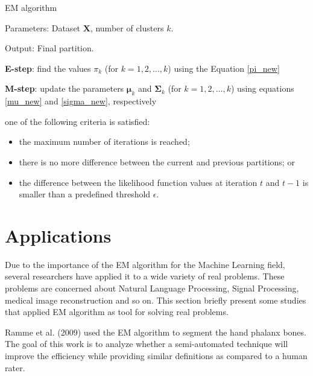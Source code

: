 \begin{algorithm}[ht]
	\caption{EM algorithm}
	\label{pseudocod}
    
    Parameters: Dataset $\textbf{X}$, number of clusters $k$.
    
    Output: Final partition.
    
	\begin{algorithmic}[1] 
		
        \REPEAT
		
		\STATE \textbf{E-step}: find the values $\pi_{k}$ (for $k = {1,2,\ldots,k}$) using the Equation \ref{pi_new}
		
		\STATE \textbf{M-step}: update the parameters $\bm{\mu}_k$ and $\bm{\Sigma}_k$ (for $k = {1,2,\ldots,k}$) using equations \ref{mu_new} and \ref{sigma_new}, respectively
				
		\UNTIL one of the following criteria is satisfied:
   \begin{itemize}
       \item the maximum number of iterations is reached;
       \item there is no more difference between the current and previous partitions; or
       \item the difference between the likelihood function values at iteration $t$ and $t-1$ is smaller than a predefined threshold $\epsilon$.
   \end{itemize}  
	\end{algorithmic}
	
\end{algorithm}



\section{Applications}
\label{sec:applications}

Due to the importance of the EM algorithm for the Machine Learning field, several researchers have applied it to a wide variety of real problems. These problems are concerned about Natural Language Processing, Signal Processing, medical image reconstruction and so on. This section briefly present some studies that applied EM algorithm as tool for solving real problems.

Ramme et al. (2009) \cite{ramme2009semi} used the EM algorithm to segment the hand phalanx bones. The goal of this work is to  analyze whether a semi-automated technique will improve the efficiency while providing similar definitions as compared to a human rater. %


